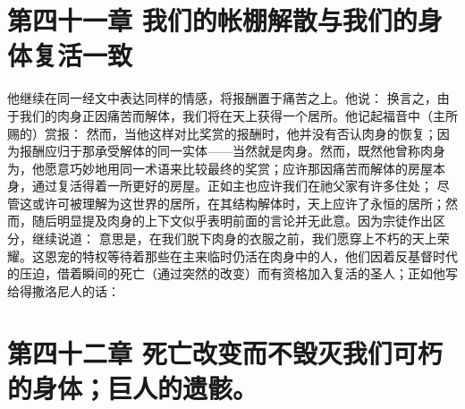 
\section{第四十一章 我们的帐棚解散与我们的身体复活一致}

他继续在同一经文中表达同样的情感，将报酬置于痛苦之上。他说： 换言之，由于我们的肉身正因痛苦而解体，我们将在天上获得一个居所。他记起福音中（主所赐的）赏报： 然而，当他这样对比奖赏的报酬时，他并没有否认肉身的恢复；因为报酬应归于那承受解体的同一实体——当然就是肉身。然而，既然他曾称肉身为，他愿意巧妙地用同一术语来比较最终的奖赏；应许那因痛苦而解体的房屋本身，通过复活得着一所更好的房屋。正如主也应许我们在祂父家有许多住处； 尽管这或许可被理解为这世界的居所，在其结构解体时，天上应许了永恒的居所；然而，随后明显提及肉身的上下文似乎表明前面的言论并无此意。因为宗徒作出区分，继续说道： 意思是，在我们脱下肉身的衣服之前，我们愿穿上不朽的天上荣耀。这恩宠的特权等待着那些在主来临时仍活在肉身中的人，他们因着反基督时代的压迫，借着瞬间的死亡（通过突然的改变）而有资格加入复活的圣人；正如他写给得撒洛尼人的话：\par


\section{第四十二章 死亡改变而不毁灭我们可朽的身体；巨人的遗骸。}

